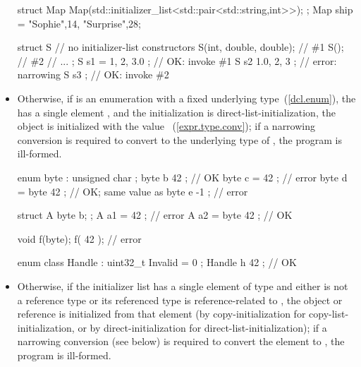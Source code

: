 \begin{itemize}
\begin{example}
\begin{codeblock}
struct Map {
  Map(std::initializer_list<std::pair<std::string,int>>);
};
Map ship = {{"Sophie",14}, {"Surprise",28}};
\end{codeblock}
\end{example}

\begin{example}
\begin{codeblock}
struct S {
  // no initializer-list constructors
  S(int, double, double);           // \#1
  S();                              // \#2
  // ...
};
S s1 = { 1, 2, 3.0 };               // OK: invoke \#1
S s2 { 1.0, 2, 3 };                 // error: narrowing
S s3 { };                           // OK: invoke \#2
\end{codeblock}
\end{example}

\item Otherwise, if  is an enumeration
with a fixed underlying type~(\ref{dcl.enum}),
the  has a single element , and
the initialization is direct-list-initialization,
the object is initialized with the value ~(\ref{expr.type.conv});
if a narrowing conversion is required to convert 
to the underlying type of , the program is ill-formed.
\begin{example}
\begin{codeblock}
enum byte : unsigned char { };
byte b { 42 };                      // OK
byte c = { 42 };                    // error
byte d = byte{ 42 };                // OK; same value as 
byte e { -1 };                      // error

struct A { byte b; };
A a1 = { { 42 } };                  // error
A a2 = { byte{ 42 } };              // OK

void f(byte);
f({ 42 });                          // error

enum class Handle : uint32_t { Invalid = 0 };
Handle h { 42 };                    // OK
\end{codeblock}
\end{example}

\item Otherwise, if
the initializer list has a single element of type  and either
 is not a reference type or its referenced type is
reference-related to , the object or reference is initialized
from that element (by copy-initialization for copy-list-initialization,
or by direct-initialization for direct-list-initialization);
if a narrowing conversion (see below) is required
to convert the element to , the program is ill-formed.


\end{itemize}
